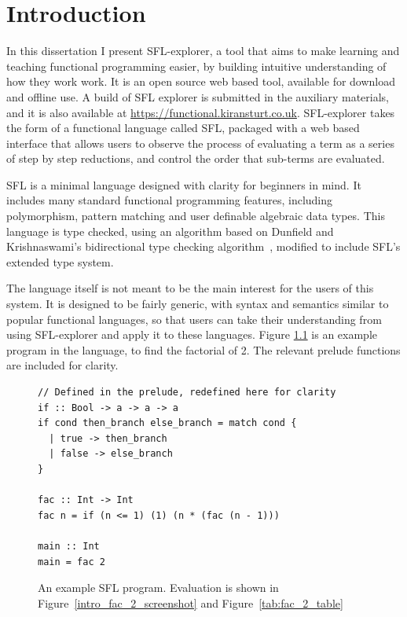 \chapter{Introduction}
\label{chap:context}
In this dissertation I present SFL-explorer, a tool that aims to make learning and teaching functional programming easier, by building intuitive understanding of how they work work. It is an open source web based tool, available for download and offline use. A build of SFL explorer is submitted in the auxiliary materials, and it is also available at \href{https://functional.kiransturt.co.uk}{https://functional.kiransturt.co.uk}. 
SFL-explorer takes the form of a functional language called \ac{SFL}, packaged with a web based interface that allows users to observe the process of evaluating a term as a series of step by step reductions, and control the order that sub-terms are evaluated. 


\ac{SFL} is a minimal language designed with clarity for beginners in mind. It includes many standard functional programming features, including polymorphism, pattern matching and user definable algebraic data types. This language is type checked, using an algorithm based on Dunfield and Krishnaswami's bidirectional type checking algorithm~\cite{completebidir}, modified to include \ac{SFL}'s extended type system. 

The language itself is not meant to be the main interest for the users of this system. It is designed to be fairly generic, with syntax and semantics similar to popular functional languages, so that users can take their understanding from using SFL-explorer and apply it to these languages. Figure \ref{tab:fac_2_table_input} is an example program in the language, to find the factorial of 2. The relevant prelude functions are included for clarity.

\begin{figure}[h]
\begin{lstlisting}[language=SFL]
// Defined in the prelude, redefined here for clarity
if :: Bool -> a -> a -> a
if cond then_branch else_branch = match cond {
  | true -> then_branch
  | false -> else_branch
}

fac :: Int -> Int
fac n = if (n <= 1) (1) (n * (fac (n - 1)))

main :: Int
main = fac 2
\end{lstlisting}
\caption{An example SFL program. Evaluation is shown in Figure~\ref{intro_fac_2_screenshot} and Figure~\ref{tab:fac_2_table}}
\label{tab:fac_2_table_input}
\end{figure}


